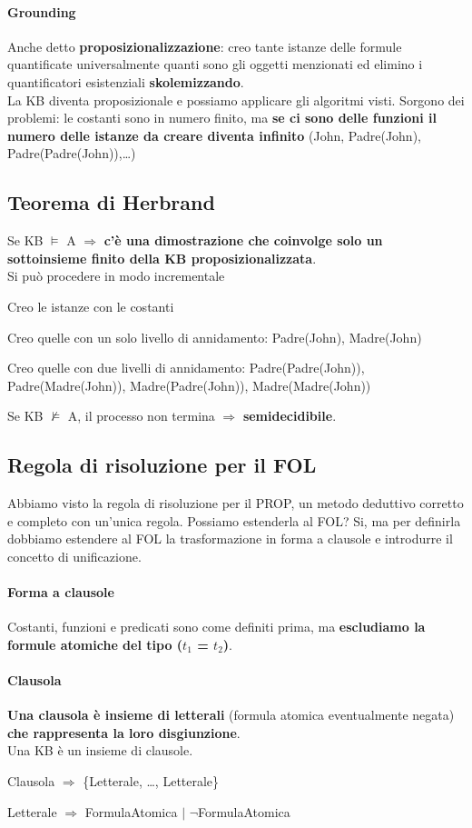 \documentclass[10pt]{book}
\begin{document}
\paragraph{Grounding} Anche detto \textbf{proposizionalizzazione}: creo tante istanze delle formule quantificate universalmente quanti sono gli oggetti menzionati ed elimino i quantificatori esistenziali \textbf{skolemizzando}.\\
La KB diventa proposizionale e possiamo applicare gli algoritmi visti. Sorgono dei problemi: le costanti sono in numero finito, ma \textbf{se ci sono delle funzioni il numero delle istanze da creare diventa infinito} (John, Padre(John), Padre(Padre(John)),\ldots)
\subsection{Teorema di Herbrand}
Se KB $\vDash$ A $\Rightarrow$ \textbf{c'è una dimostrazione che coinvolge solo un sottoinsieme finito della KB proposizionalizzata}.\\
Si può procedere in modo incrementale
\begin{list}{}{}
	\item Creo le istanze con le costanti
	\item Creo quelle con un solo livello di annidamento: Padre(John), Madre(John)
	\item Creo quelle con due livelli di annidamento: Padre(Padre(John)), Padre(Madre(John)), Madre(Padre(John)), Madre(Madre(John))
\end{list}
Se KB $\not\vDash$ A, il processo non termina $\Rightarrow$ \textbf{semidecidibile}.
\subsection{Regola di risoluzione per il FOL}
Abbiamo visto la regola di risoluzione per il PROP, un metodo deduttivo corretto e completo con un'unica regola. Possiamo estenderla al FOL? Si, ma per definirla dobbiamo estendere al FOL la trasformazione in forma a clausole e introdurre il concetto di unificazione.
\pagebreak
\paragraph{Forma a clausole}
Costanti, funzioni e predicati sono come definiti prima, ma \textbf{escludiamo la formule atomiche del tipo ($t_1$ = $t_2$)}.
\paragraph{Clausola} \textbf{Una clausola è insieme di letterali} (formula atomica eventualmente negata) \textbf{che rappresenta la loro disgiunzione}.\\
Una KB è un insieme di clausole.
\begin{list}{}{}
	\item Clausola $\Rightarrow$ \{Letterale, \ldots, Letterale\}
	\item Letterale $\Rightarrow$ FormulaAtomica $|$ $\neg$FormulaAtomica
\end{list}
\end{document}
